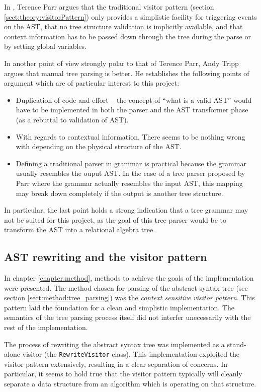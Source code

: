 In \cite{translators_should_use_tree_grammars}, Terence Parr argues that the
traditional visitor
pattern (section \ref{sect:theory:visitorPattern}) only provides a
simplistic facility for triggering events on the AST, that no tree structure
validation is implicitly available, and that context information has to be
passed down through the tree during the parse or by setting global variables.

In another point of view strongly polar to that of Terence Parr, Andy Tripp
argues that manual tree parsing is better\cite{manual_tree_walking_is_better}. He establishes the following points
of argument which are of particular interest to this project:
\begin{itemize}
  \item Duplication of code and effort -- the concept of ``what is a valid AST''
  would have to be implemented in both the parser and the AST transformer phase
  (as a rebuttal to validation of AST).
  \item With regards to contextual information, There seems to be nothing wrong
  with depending on the physical structure of the AST.
  \item Defining a traditional parser in grammar is practical because the grammar
  usually resembles the ouput AST. In the case of a tree parser proposed by Parr
  where the grammar actually resembles the input AST, this mapping may break
  down completely if the output is another tree structure.
\end{itemize}

In particular, the last point holds a strong indication that a tree grammar
may not be suited for this project, as the goal of this tree parser would be to
transform the AST into a relational algebra tree.

\subsection{AST rewriting and the visitor pattern}
In chapter \ref{chapter:method}, methods to achieve the goals
of the implementation were presented. The method chosen for parsing of the
abstract syntax tree (see section \ref{sect:method:tree_parsing}) was the
\emph{context sensitive visitor pattern}. This pattern laid the foundation for
a clean and simplistic implementation. The semantics of the tree parsing process
itself did not interfer unecessarily with the rest of the implementation.

The process of rewriting the abstract syntax tree was implemented as a
stand-alone visitor (the \texttt{RewriteVisitor} class). This implementation
exploited the visitor pattern extensively, resulting in a clear separation of
concerns. In particular, it seems to hold true that the visitor pattern
typically will cleanly separate a data structure from an algorithm which is
operating on that structure.

